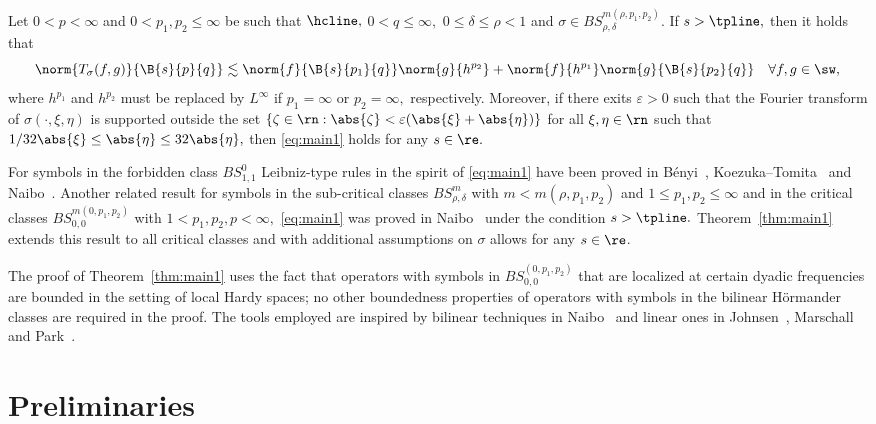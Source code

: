 \begin{theorem} \label{thm:main1}
Let $0<p<\infty$ and  $0<p_1,p_2\le \infty$ be such that $\hcline,$ $0<q\le \infty,$   $0\le\delta\le \rho<1$ and   $\sigma\in BS^{m(\rho,p_1,p_2)}_{\rho,\delta}.$ If $s>\tpline,$ then it holds that
\begin{equation}\label{eq:main1}
\norm{T_\sigma(f,g)}{\B{s}{p}{q}}\lesssim \norm{f}{\B{s}{p_1}{q}}\norm{g}{h^{p_2}} +\norm{f}{h^{p_1}}\norm{g}{\B{s}{p_2}{q}}\quad \forall f,g\in \sw,
\end{equation}
where $h^{p_1}$ and $h^{p_2}$ must be replaced by $L^\infty$ if $p_1=\infty$ or $p_2=\infty,$ respectively. Moreover,  if there exits $\varepsilon>0$ such that the Fourier transform of  $\sigma(\cdot,\xi,\eta)$ is  supported outside the set  $\{\zeta\in\rn:\abs{\zeta}<\varepsilon (\abs{\xi}+\abs{\eta})\}$ for all  $\xi,\eta\in\rn$ such that $1/32\abs{\xi}\le \abs{\eta}\le 32 \abs{\eta},$ then \eqref{eq:main1} holds for any $s\in\re.$
\end{theorem}

For symbols in the forbidden class $BS^{0}_{1,1}$ Leibniz-type rules in the spirit of \eqref{eq:main1} have been proved in B\'enyi~\cite{MR1996120}, Koezuka--Tomita~\cite{MR3750316} and Naibo~\cite{MR3393696}.  Another related result for symbols in the sub-critical classes $BS^m_{\rho,\delta}$ with $m<m(\rho,p_1,p_2)$ and $1\le p_1,p_2\le \infty$ and in the critical classes $BS^{m(0,p_1,p_2)}_{0,0}$ with $1<p_1,p_2,p<\infty,$ \eqref{eq:main1} was proved in Naibo~\cite[Theorem 1.3]{MR3393696} under the condition $s>\tpline.$ Theorem~\ref{thm:main1} extends this result to all critical classes and with additional assumptions on $\sigma$ allows for any $s\in\re$.

The proof of Theorem~\ref{thm:main1} uses the fact that operators with symbols in $BS^{(0,p_1,p_2)}_{0,0}$ that are localized at certain dyadic frequencies are bounded in the setting of local Hardy spaces; no other boundedness properties of operators with symbols in the bilinear H\"ormander classes are required in the proof. The tools employed are inspired by bilinear techniques in Naibo~\cite{MR3393696} and linear ones in   Johnsen~\cite{MR2163627}, Marschall~\cite{MR1376592} and   Park~\cite{MR3759556}.

\section{Preliminaries}